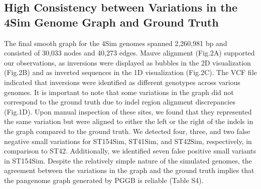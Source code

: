 \subsection{High Consistency between Variations in the 4Sim Genome Graph and Ground Truth}
The final smooth graph for the 4Sim genomes spanned 2,260,981 bp and consisted of 30,033 nodes and 40,273 edges. Mauve alignment (Fig.2A) supported our observations, as inversions were displayed as bubbles in the 2D visualization (Fig.2B) and as inverted sequences in the 1D visualization (Fig.2C). The VCF file indicated that inversions were identified as different genotypes across various genomes. It is important to note that some variations in the graph did not correspond to the ground truth due to indel region alignment discrepancies (Fig.1D). Upon manual inspection of these sites, we found that they represented the same variation but were aligned to either the left or the right of the indels in the graph compared to the ground truth. We detected four, three, and two false negative small variations for ST154Sim, ST41Sim, and ST42Sim, respectively, in comparison to ST42. Additionally, we identified seven false positive small variants in ST154Sim. Despite the relatively simple nature of the simulated genomes, the agreement between the variations in the graph and the ground truth implies that the pangenome graph generated by PGGB is reliable (Table S4).
